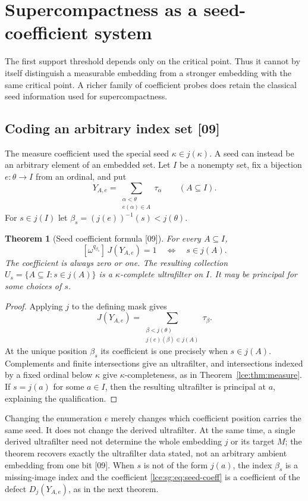 \documentclass[11pt,letterpaper]{article}
\numberwithin{equation}{section}
\newtheorem{theorem}{Theorem}[section]
\theoremstyle{definition}
\theoremstyle{remark}
\newcommand{\coef}[2]{[\omega^{#1}]\,#2}
\newcommand{\thref}[1]{Theorem~\ref{#1}}
\newcommand{\src}[1]{\textup{\textsf{\small[#1]}}}%
\begin{document}
\section{Supercompactness as a seed-coefficient system}\label{lce:sec:supercompact}

The first support threshold depends only on the critical point. Thus it
cannot by itself distinguish a measurable embedding from a stronger
embedding with the same critical point. A richer family of coefficient
probes does retain the classical seed information used for
supercompactness.

\subsection{Coding an arbitrary index set \src{09}}
The measure coefficient used the special seed $\kappa\in j(\kappa)$. A seed
can instead be an arbitrary element of an embedded set. Let $I$ be a
nonempty set, fix a bijection $e:\theta\to I$ from an ordinal, and put
\begin{equation}\label{lce:sg:eq:seed-mask}
 Y_{A,e}=\sum_{\substack{\alpha<\theta\\e(\alpha)\in A}}\tau_\alpha
 \qquad(A\subseteq I).
\end{equation}
For $s\in j(I)$ let $\beta_s=(j(e))^{-1}(s)<j(\theta)$.

\begin{theorem}[Seed coefficient formula \src{09}]\label{lce:sg:thm:seed}
For every $A\subseteq I$,
\begin{equation}\label{lce:sg:eq:seed-coeff}
 \coef{q_{\beta_s}}{J(Y_{A,e})}=1
 \quad\Longleftrightarrow\quad s\in j(A).
\end{equation}
The coefficient is always zero or one. The resulting collection
$U_s=\{A\subseteq I:s\in j(A)\}$ is a $\kappa$-complete ultrafilter on $I$.
It may be principal for some choices of $s$.
\end{theorem}
\begin{proof}
Applying $j$ to the defining mask gives
\[
 J(Y_{A,e})=\sum_{\substack{\beta<j(\theta)\\j(e)(\beta)\in j(A)}}\tau_\beta.
\]
At the unique position $\beta_s$ its coefficient is one precisely when
$s\in j(A)$. Complements and finite intersections give an ultrafilter, and
intersections indexed by a fixed ordinal below $\kappa$ give
$\kappa$-completeness, as in \thref{lce:thm:measure}. If $s=j(a)$ for some
$a\in I$, then the resulting ultrafilter is principal at $a$, explaining the
qualification.
\end{proof}
Changing the enumeration $e$ merely changes which coefficient position
carries the same seed. It does not change the derived ultrafilter. At the
same time, a single derived ultrafilter need not determine the whole
embedding $j$ or its target $M$; the theorem recovers exactly the
ultrafilter data stated, not an arbitrary ambient embedding from one bit
\src{09}. When $s$ is not of the form $j(a)$, the index $\beta_s$ is a
missing-image index and the coefficient \eqref{lce:sg:eq:seed-coeff} is a
coefficient of the defect $D_j(Y_{A,e})$, as in the next theorem.
\end{document}
